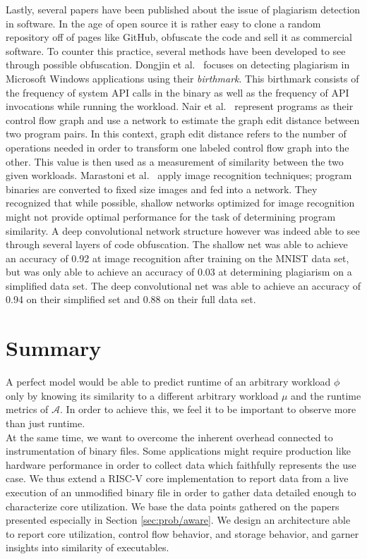 \documentclass[../bachelor_paper.tex]{subfiles}
\begin{document}
Lastly, several papers have been published about the issue of plagiarism detection in software. In the age of open source it is rather easy to clone a random repository off of pages like GitHub, obfuscate the code and sell it as commercial software. To counter this practice, several methods have been developed to see through possible obfuscation. Dongjin et al.\ \cite{kimMeasuringSimilarityWindows2013} focuses on detecting plagiarism in Microsoft Windows applications using their \emph{birthmark}. This birthmark consists of the frequency of system \acs{API} calls in the binary as well as the frequency of \acs{API} invocations while running the workload. Nair et al.\ \cite{nairFuncGNNGraphNeural2020} represent programs as their control flow graph and use a network to estimate the graph edit distance between two program pairs. In this context, graph edit distance refers to the number of operations needed in order to transform one labeled control flow graph into the other. This value is then used as a measurement of similarity between the two given workloads. Marastoni et al.\ \cite{marastoniDeepLearningApproach2018} apply image recognition techniques; program binaries are converted to fixed size images and fed into a network. They recognized that while possible, shallow networks optimized for image recognition might not provide optimal performance for the task of determining program similarity. A deep convolutional network structure however was indeed able to see through several layers of code obfuscation. The shallow net was able to achieve an accuracy of 0.92 at image recognition after training on the MNIST data set, but was only able to achieve an accuracy of 0.03 at determining plagiarism on a simplified data set. The deep convolutional net was able to achieve an accuracy of 0.94 on their simplified set and 0.88 on their full data set.

\section{Summary}
	\label{ch:theo/simi/summ}
A perfect model would be able to predict runtime of an arbitrary workload $\phi$ only by knowing its similarity to a different arbitrary workload $\mu$ and the runtime metrics of $\mathcal{A}$. In order to achieve this, we feel it to be important to observe more than just runtime.\\
At the same time, we want to overcome the inherent overhead connected to instrumentation of binary files. Some applications might require production like hardware performance in order to collect data which faithfully represents the use case. We thus extend a RISC-V core implementation to report data from a live execution of an unmodified binary file in order to gather data detailed enough to characterize core utilization. We base the data points gathered on the papers presented especially in Section \ref{sec:prob/aware}. We design an architecture able to report core utilization, control flow behavior, and storage behavior, and garner insights into similarity of executables.



\isstandalone



\fi
\end{document}
